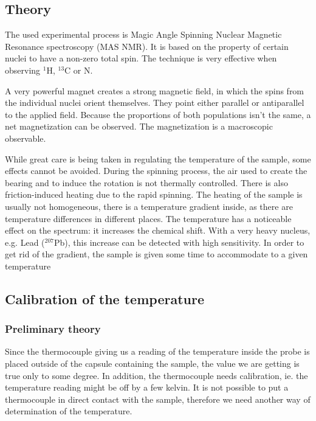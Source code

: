 \documentclass[12pt]{article}
\begin{document}
\subsection{Theory}

The used experimental process is Magic Angle Spinning Nuclear Magnetic Resonance spectroscopy (MAS NMR). It is based on the property of certain nuclei to have a non-zero total spin. The technique is very effective when observing $^1$H, $^{13}$C or N.

A very powerful magnet creates a strong magnetic field, in which the spins from the individual nuclei orient themselves. They point either parallel or antiparallel to the applied field. Because the proportions of both populations isn't the same, a net magnetization can be observed. The magnetization is a macroscopic observable.

While great care is being taken in regulating the temperature of the sample, some effects cannot be avoided. During the spinning process, the air used to create the bearing and to induce the rotation is not thermally controlled. There is also friction-induced heating due to the rapid spinning. The heating of the sample is usually not homogeneous, there is a temperature gradient inside, as there are temperature differences in different places. The temperature has a noticeable effect on the spectrum: it increases the chemical shift. With a very heavy nucleus, e.g. Lead ($^{207}$Pb), this increase can be detected with high sensitivity. In order to get rid of the gradient, the sample is given some time to accommodate to a given temperature

\subsection{Calibration of the temperature}

\subsubsection{Preliminary theory}

Since the thermocouple giving us a reading of the temperature inside the probe is placed outside of the capsule containing the sample, the value we are getting is true only to some degree. In addition, the thermocouple needs calibration, ie. the temperature reading might be off by a few kelvin. It is not possible to put a thermocouple in direct contact with the sample, therefore we need another way of determination of the temperature.
\end{document}
